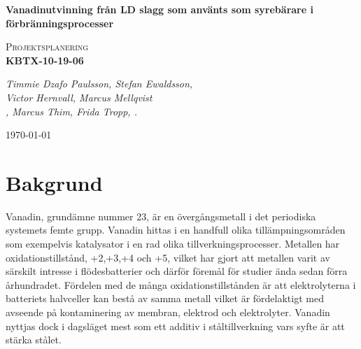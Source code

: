 \documentclass{article}
\begin{document}
\begin{titlepage}
\begin{centering}

{\huge\bfseries Vanadinutvinning från LD slagg som använts som syrebärare i förbränningsprocesser \par}
\vspace{1cm}
{\scshape\Large Projektsplanering \\ \textbf{KBTX-10-19-06}\par}
{\scshape\Large \par}
{\Large\itshape Timmie Dzafo Paulsson, Stefan Ewaldsson, \\ Victor Hernvall, Marcus Mellqvist \\ , Marcus Thim, Frida Tropp, .\par}
{\large \today\par}
{   \par}
{   \par}
{    \par}





\end{centering}
\end{titlepage}


\begin{centering}
\end{centering}
\newpage
\thispagestyle{empty}
\thispagestyle{empty}
\tableofcontents
\thispagestyle{empty}
\newpage
{}







\section{Bakgrund}
Vanadin, grundämne nummer 23, är en övergångsmetall i det periodiska systemets femte grupp. Vanadin hittas i en handfull olika tillämpningsområden som exempelvis katalysator i en rad olika tillverkningsprocesser\cite{Pecoraro2014}.
Metallen har oxidationstillstånd, +2,+3,+4 och +5,  \cite{Baroch2013} vilket har gjort att metallen varit av särskilt intresse i flödesbatterier och därför föremål för studier ända sedan förra århundradet\cite{Skyllas-Kazacos1987}.
Fördelen med de många oxidationstillstånden är att elektrolyterna i batteriets halvceller kan bestå av samma metall vilket är fördelaktigt med avseende på kontaminering av membran, elektrod och elektrolyter\cite{Lopez-Vizcaino2017}. Vanadin nyttjas dock i dagsläget mest som ett additiv i ståltillverkning vars syfte är att stärka stålet\cite{Baroch2013}.
\end{document}
